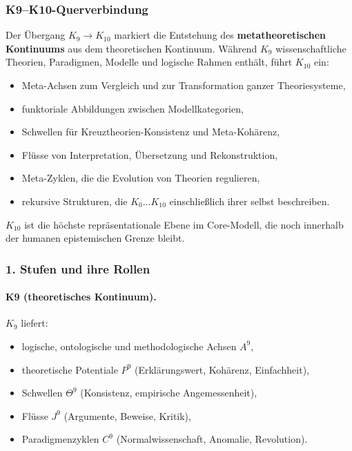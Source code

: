 
\subsubsection{K9–K10-Querverbindung}
\label{sec:crossk-k9-k10}

Der Übergang $K_9 \rightarrow K_{10}$ markiert die Entstehung des
\textbf{metatheoretischen Kontinuums} aus dem theoretischen Kontinuum.
Während $K_9$ wissenschaftliche Theorien, Paradigmen, Modelle und logische
Rahmen enthält, führt $K_{10}$ ein:
\begin{itemize}
  \item Meta-Achsen zum Vergleich und zur Transformation ganzer Theoriesysteme,
  \item funktoriale Abbildungen zwischen Modellkategorien,
  \item Schwellen für Kreuztheorien-Konsistenz und Meta-Kohärenz,
  \item Flüsse von Interpretation, Übersetzung und Rekonstruktion,
  \item Meta-Zyklen, die die Evolution von Theorien regulieren,
  \item rekursive Strukturen, die $K_0 \dots K_{10}$ einschließlich ihrer selbst
        beschreiben.
\end{itemize}

$K_{10}$ ist die höchste repräsentationale Ebene im Core-Modell, die noch innerhalb
der humanen epistemischen Grenze bleibt.

\subsubsection{1. Stufen und ihre Rollen}

\paragraph{K9 (theoretisches Kontinuum).}
$K_9$ liefert:
\begin{itemize}
  \item logische, ontologische und methodologische Achsen $A^9$,
  \item theoretische Potentiale $P^9$ (Erklärungswert, Kohärenz, Einfachheit),
  \item Schwellen $\Theta^9$ (Konsistenz, empirische Angemessenheit),
  \item Flüsse $J^9$ (Argumente, Beweise, Kritik),
  \item Paradigmenzyklen $C^9$ (Normalwissenschaft, Anomalie, Revolution).
\end{itemize}

